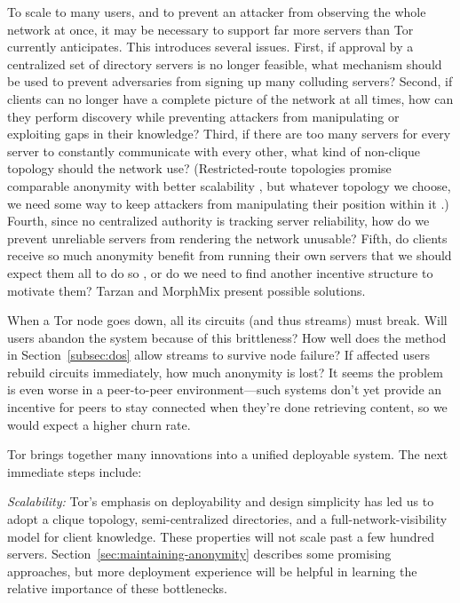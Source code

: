 \documentclass[times,10pt,twocolumn]{article}
\begin{document}
To scale to many users, and to prevent an attacker from observing the
whole network at once, it may be necessary 
to support far more servers than Tor currently anticipates.
This introduces several issues.  First, if approval by a centralized set
of directory servers is no longer feasible, what mechanism should be used
to prevent adversaries from signing up many colluding servers? Second,
if clients can no longer have a complete picture of the network at all
times, how can they perform discovery while preventing attackers from
manipulating or exploiting gaps in their knowledge?  Third, if there
are too many servers for every server to constantly communicate with
every other, what kind of non-clique topology should the network use?
(Restricted-route topologies promise comparable anonymity with better
scalability \cite{danezis-pets03}, but whatever topology we choose, we
need some way to keep attackers from manipulating their position within
it \cite{casc-rep}.) Fourth, since no centralized authority is tracking
server reliability, how do we prevent unreliable servers from rendering
the network unusable?  Fifth, do clients receive so much anonymity benefit
from running their own servers that we should expect them all to do so
\cite{econymics}, or do we need to find another incentive structure to
motivate them?  Tarzan and MorphMix present possible solutions.


When a Tor node goes down, all its circuits (and thus streams) must break.
Will users abandon the system because of this brittleness? How well
does the method in Section~\ref{subsec:dos} allow streams to survive
node failure? If affected users rebuild circuits immediately, how much
anonymity is lost? It seems the problem is even worse in a peer-to-peer
environment---such systems don't yet provide an incentive for peers to
stay connected when they're done retrieving content, so we would expect
a higher churn rate.


\label{sec:conclusion}

Tor brings together many innovations into a unified deployable system. The
next immediate steps include:

\emph{Scalability:} Tor's emphasis on deployability and design simplicity
has led us to adopt a clique topology, semi-centralized 
directories, and a full-network-visibility model for client
knowledge. These properties will not scale past a few hundred servers.
Section~\ref{sec:maintaining-anonymity} describes some promising
approaches, but more deployment experience will be helpful in learning
the relative importance of these bottlenecks.
\end{document}
